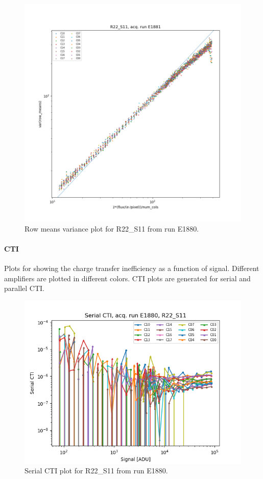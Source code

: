 \begin{figure}
    \centering
    \includegraphics[width=0.8\linewidth]{figures/ReferenceFigures/row_means_variance_plot_LSSTCam_R22_S11_u_lsstccs_eo_ptc_plots_E1881_w_2024_35_20241105T131208Z.png}
    \caption{Row means variance plot for R22\_S11 from run E1880.}
    \label{fig:ref:rowMeansVar}
\end{figure}

\clearpage
\paragraph{CTI}

Plots for showing the charge transfer inefficiency as a function of signal. Different amplifiers are plotted in different colors. CTI plots are generated for serial and parallel CTI.

\begin{figure}
    \centering
    \includegraphics[width=0.8\linewidth]{figures/ReferenceFigures/scti_vs_flux_plot_LSSTCam_R22_S11_u_lsstccs_eo_cti_vs_flux_E1880_w_2024_35_20241101T020455Z.png}
    \caption{Serial CTI plot for R22\_S11 from run E1880.}
    \label{fig:ref:scti}
\end{figure}

